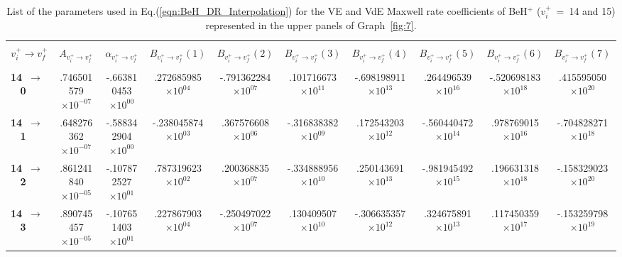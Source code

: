 \documentclass[reviewcopy]{elsarticle}
\begin{document}
\begin{landscape}
\renewcommand{\thefootnote}{\fnsymbol{footnote}}
\renewcommand{\arraystretch}{0.81}
\scriptsize
\setlength\tabcolsep{1.2ex}
\begin{longtable}{lccccccccc}
\caption[table9]{List of the parameters used in Eq.(\ref{eqn:BeH_DR_Interpolation}) for the VE and VdE Maxwell rate coefficients of BeH$^+$  ($v^+_i$~=~14 and 15) represented in the upper panels of Graph~\ref{fig:7}.}\label{tab:BeH_VE_Interpolation14-15}\vspace{0.5cm}\\
\hline \\[-2ex]
   \multicolumn{1}{c}{$v^+_i \to v^+_f$} &
   \multicolumn{1}{c}{$A_{{v^+_i}\to {v^+_f}}$} &
   \multicolumn{1}{c}{$\alpha_{{v^+_i}\to {v^+_f}}$} &
   \multicolumn{1}{c}{$B_{{v^+_i}\to {v^+_f}}(1)$} &
   \multicolumn{1}{c}{$B_{{v^+_i}\to {v^+_f}}(2)$} &
   \multicolumn{1}{c}{$B_{{v^+_i}\to {v^+_f}}(3)$} &
   \multicolumn{1}{c}{$B_{{v^+_i}\to {v^+_f}}(4)$}  &
   \multicolumn{1}{c}{$B_{{v^+_i}\to {v^+_f}}(5)$} &
   \multicolumn{1}{c}{$B_{{v^+_i}\to {v^+_f}}(6)$} &
   \multicolumn{1}{c}{$B_{{v^+_i}\to {v^+_f}}(7)$} \\[5pt]
 \hline \\[-2ex]
\endhead
{\bf 14~$\to$~ 0}   &   .746501579$\times10^{-07}$ & -.663810453$\times10^{ 00}$ &  .272685985$\times10^{ 04}$ & -.791362284$\times10^{ 07}$ &  .101716673$\times10^{ 11}$ & -.698198911$\times10^{ 13}$ &  .264496539$\times10^{ 16}$ & -.520698183$\times10^{ 18}$ &  .415595050$\times10^{ 20}$ \\
{\bf 14~$\to$~ 1}   &   .648276362$\times10^{-07}$ & -.588342904$\times10^{ 00}$ & -.238045874$\times10^{ 03}$ &  .367576608$\times10^{ 06}$ & -.316838382$\times10^{ 09}$ &  .172543203$\times10^{ 12}$ & -.560440472$\times10^{ 14}$ &  .978769015$\times10^{ 16}$ & -.704828271$\times10^{ 18}$ \\
{\bf 14~$\to$~ 2}   &   .861241840$\times10^{-05}$ & -.107872527$\times10^{ 01}$ &  .787319623$\times10^{ 02}$ &  .200368835$\times10^{ 07}$ & -.334888956$\times10^{ 10}$ &  .250143691$\times10^{ 13}$ & -.981945492$\times10^{ 15}$ &  .196631318$\times10^{ 18}$ & -.158329023$\times10^{ 20}$ \\
{\bf 14~$\to$~ 3}   &   .890745457$\times10^{-05}$ & -.107651403$\times10^{ 01}$ &  .227867903$\times10^{ 04}$ & -.250497022$\times10^{ 07}$ &  .130409507$\times10^{ 10}$ & -.306635357$\times10^{ 12}$ &  .324675891$\times10^{ 13}$ &  .117450359$\times10^{ 17}$ & -.153259798$\times10^{ 19}$ \\

\end{longtable}
\end{landscape}
\end{document}
